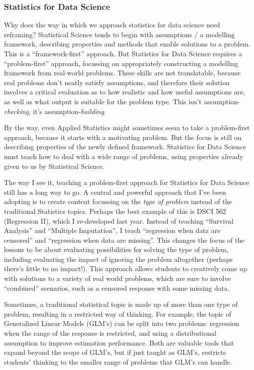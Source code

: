 \documentclass[]{article}
\begin{document}
\hypertarget{statistics-for-data-science}{%
\subsubsection{Statistics for Data Science}\label{statistics-for-data-science}}

Why does the way in which we approach statistics for data science need reframing? Statistical Science tends to begin with assumptions / a modelling framework, describing properties and methods that enable solutions to a problem. This is a ``framework-first'' approach. But Statistics for Data Science requires a ``problem-first'' approach, focussing on appropriately constructing a modelling framework from real-world problems. These skills are not translatable, because real problems don't neatly satisfy assumptions, and therefore their solution involves a critical evaluation as to how realistic and how useful assumptions are, as well as what output is suitable for the problem type. This isn't assumption-\emph{checking}, it's assumption-\emph{building}.

By the way, even Applied Statistics might sometimes seem to take a problem-first approach, because it starts with a motivating problem. But the focus is still on describing properties of the newly defined framework. Statistics for Data Science must teach how to deal with a wide range of problems, using properties already given to us by Statistical Science.

The way I see it, teaching a problem-first approach for Statistics for Data Science still has a long way to go. A central and powerful approach that I've been adopting is to create content focussing on the \emph{type of problem} instead of the traditional Statistics topics. Perhaps the best example of this is DSCI 562 (Regression II), which I re-developed last year. Instead of teaching ``Survival Analysis'' and ``Multiple Imputation'', I teach ``regression when data are censored'' and ``regression when data are missing''. This changes the focus of the lessons to be about evaluating possibilities for solving the type of problem, including evaluating the impact of ignoring the problem altogether (perhaps there's little to no impact!). This approach allows students to creatively come up with solutions to a variety of real world problems, which are sure to involve ``combined'' scenarios, such as a censored response with some missing data.

Sometimes, a traditional statistical topic is made up of more than one type of problem, resulting in a restricted way of thinking. For example, the topic of Generalized Linear Models (GLM's) can be split into two problems: regression when the range of the response is restricted, and using a distributional assumption to improve estimation performance. Both are valuable tools that expand beyond the scope of GLM's, but if just taught as GLM's, restricts students' thinking to the smaller range of problems that GLM's can handle.
\end{document}
